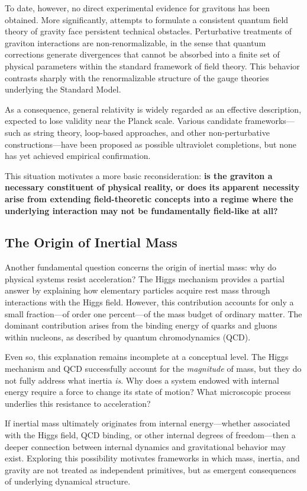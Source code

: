 \documentclass[12pt,letterpaper]{article}
\begin{document}
To date, however, no direct experimental evidence for gravitons has been obtained. More significantly, attempts to formulate a consistent quantum field theory of gravity face persistent technical obstacles. Perturbative treatments of graviton interactions are non-renormalizable, in the sense that quantum corrections generate divergences that cannot be absorbed into a finite set of physical parameters within the standard framework of field theory. This behavior contrasts sharply with the renormalizable structure of the gauge theories underlying the Standard Model.

As a consequence, general relativity is widely regarded as an effective description, expected to lose validity near the Planck scale. Various candidate frameworks—such as string theory, loop-based approaches, and other non-perturbative constructions—have been proposed as possible ultraviolet completions, but none has yet achieved empirical confirmation.

This situation motivates a more basic reconsideration: \textbf{is the graviton a necessary constituent of physical reality, or does its apparent necessity arise from extending field-theoretic concepts into a regime where the underlying interaction may not be fundamentally field-like at all?}


\subsection{The Origin of Inertial Mass}
\label{subsec:inertial_mass}

Another fundamental question concerns the origin of inertial mass: why do physical systems resist acceleration? The Higgs mechanism provides a partial answer by explaining how elementary particles acquire rest mass through interactions with the Higgs field. However, this contribution accounts for only a small fraction—of order one percent—of the mass budget of ordinary matter. The dominant contribution arises from the binding energy of quarks and gluons within nucleons, as described by quantum chromodynamics (QCD).

Even so, this explanation remains incomplete at a conceptual level. The Higgs mechanism and QCD successfully account for the \textit{magnitude} of mass, but they do not fully address what inertia \textit{is}. Why does a system endowed with internal energy require a force to change its state of motion? What microscopic process underlies this resistance to acceleration?

If inertial mass ultimately originates from internal energy—whether associated with the Higgs field, QCD binding, or other internal degrees of freedom—then a deeper connection between internal dynamics and gravitational behavior may exist. Exploring this possibility motivates frameworks in which mass, inertia, and gravity are not treated as independent primitives, but as emergent consequences of underlying dynamical structure.
\end{document}
